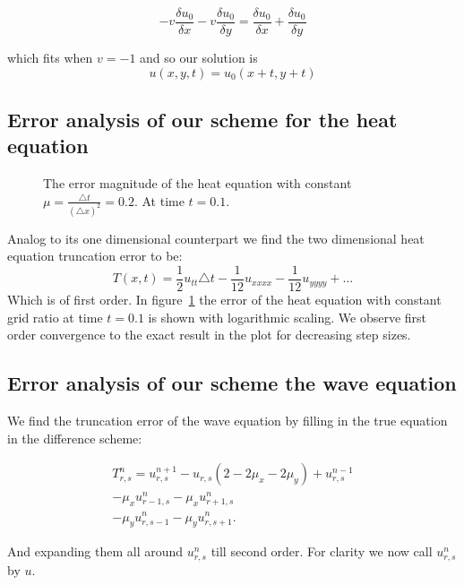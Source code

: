 \begin{equation}
-v\frac{\delta u_0}{\delta x}-v\frac{\delta u_0}{\delta y} = \frac{\delta u_0}{\delta x}+\frac{\delta u_0}{\delta y} 
\end{equation}

which fits when $v=-1$ and so our solution is
\begin{equation}
u(x,y,t)=u_0(x+t,y+t)
\end{equation}

\subsection{Error analysis of our scheme for the heat equation}
\begin{figure}

\caption{The error magnitude of the heat equation with constant $\mu = \frac{\triangle t}{(\triangle x)^2} = 0.2$. At time $t = 0.1$.}
\label{error:Heat}
\end{figure}
Analog to its one dimensional counterpart we find the two dimensional heat equation truncation error to be:
\begin{equation}
T(x,t) = \frac{1}{2} u_{tt} \triangle t - \frac{1}{12} u_{xxxx} - \frac{1}{12} u_{yyyy} + \dots
\end{equation}
Which is of first order. In figure~\ref{error:Heat} the error of the heat equation with constant grid ratio at time $t = 0.1$ is shown with logarithmic scaling. We observe first order convergence to the exact result in the plot for decreasing step sizes.

\subsection{Error analysis of our scheme the wave equation}
We find the truncation error of the wave equation by filling in the true equation in the difference scheme:

\begin{align*}
T_{r,s}^n = u_{r,s}^{n+1} - u_{r,s}(2 - 2\mu_x - 2 \mu_y) + u_{r,s}^{n-1} \\
				 - \mu_x u_{r-1,s}^n - \mu_x u_{r+1,s}^n	  \\
				 - \mu_y u_{r,s-1}^n - \mu_y u_{r,s+1}^n.
\end{align*}

And expanding them all around $u_{r,s}^n$ till second order. For clarity we now call $u_{r,s}^n$ by $u$.


